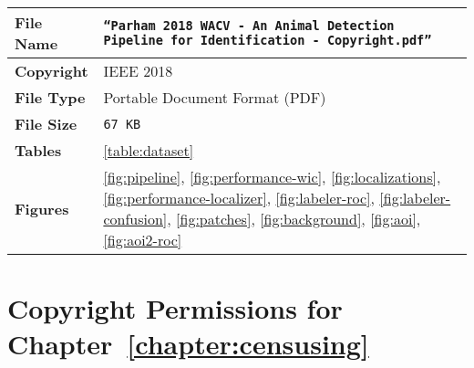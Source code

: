 \begin{table*}[!ht]
    \begin{center}
        \begin{tabular}{| l | p{13.5cm} |}
            \hline
            \textbf{File Name} & \texttt{``Parham 2018 WACV - An Animal Detection Pipeline for Identification - Copyright.pdf''}                                                                                                                                         \\
            \hline
            \textbf{Copyright} & IEEE 2018                                                                                                                                                                                                                               \\
            \hline
            \textbf{File Type} & Portable Document Format (PDF)                                                                                                                                                                                                          \\
            \hline
            \textbf{File Size} & \texttt{67 KB}                                                                                                                                                                                                                          \\
            \hline
            \textbf{Tables}    & \ref{table:dataset}                                                                                                                                                                                                                     \\
            \hline
            \textbf{Figures}   & \ref{fig:pipeline}, \ref{fig:performance-wic}, \ref{fig:localizations}, \ref{fig:performance-localizer}, \ref{fig:labeler-roc}, \ref{fig:labeler-confusion}, \ref{fig:patches}, \ref{fig:background}, \ref{fig:aoi}, \ref{fig:aoi2-roc} \\
            \hline
        \end{tabular}
    \end{center}
\end{table*}

\newpage

\section{Copyright Permissions for Chapter~\ref{chapter:censusing}}

